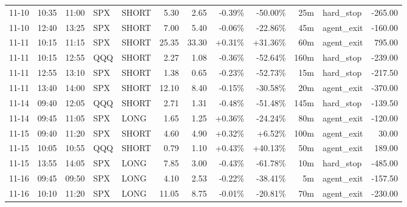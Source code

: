 \documentclass[11pt,a4paper,twoside]{article}
\begin{document}
\begin{center}
\begin{longtable}{>{\color{txtmain}}l l l l l r r r r r >{\color{txtmain}}l r}
11-10 & 10:35 & 11:00 & SPX & SHORT & 5.30 & 2.65 & \textcolor{lossred}{-0.39\%} & \textcolor{lossred}{-50.00\%} & 25m & hard\_stop & \textcolor{lossred}{-265.00} \\
11-10 & 12:40 & 13:25 & SPX & SHORT & 7.00 & 5.40 & \textcolor{lossred}{-0.06\%} & \textcolor{lossred}{-22.86\%} & 45m & agent\_exit & \textcolor{lossred}{-160.00} \\
11-11 & 10:15 & 11:15 & SPX & SHORT & 25.35 & 33.30 & \textcolor{wingreen}{+0.31\%} & \textcolor{wingreen}{+31.36\%} & 60m & agent\_exit & \textcolor{wingreen}{795.00} \\
11-11 & 10:15 & 12:55 & QQQ & SHORT & 2.27 & 1.08 & \textcolor{lossred}{-0.36\%} & \textcolor{lossred}{-52.64\%} & 160m & hard\_stop & \textcolor{lossred}{-239.00} \\
11-11 & 12:55 & 13:10 & SPX & SHORT & 1.38 & 0.65 & \textcolor{lossred}{-0.23\%} & \textcolor{lossred}{-52.73\%} & 15m & hard\_stop & \textcolor{lossred}{-217.50} \\
11-11 & 13:40 & 14:00 & SPX & SHORT & 12.10 & 8.40 & \textcolor{lossred}{-0.15\%} & \textcolor{lossred}{-30.58\%} & 20m & agent\_exit & \textcolor{lossred}{-370.00} \\
11-14 & 09:40 & 12:05 & QQQ & SHORT & 2.71 & 1.31 & \textcolor{lossred}{-0.48\%} & \textcolor{lossred}{-51.48\%} & 145m & hard\_stop & \textcolor{lossred}{-139.50} \\
11-14 & 09:45 & 11:05 & SPX & LONG & 1.65 & 1.25 & \textcolor{wingreen}{+0.36\%} & \textcolor{lossred}{-24.24\%} & 80m & agent\_exit & \textcolor{lossred}{-120.00} \\
11-15 & 09:40 & 11:20 & SPX & SHORT & 4.60 & 4.90 & \textcolor{wingreen}{+0.32\%} & \textcolor{wingreen}{+6.52\%} & 100m & agent\_exit & \textcolor{wingreen}{30.00} \\
11-15 & 10:05 & 10:55 & QQQ & SHORT & 0.79 & 1.10 & \textcolor{wingreen}{+0.43\%} & \textcolor{wingreen}{+40.13\%} & 50m & agent\_exit & \textcolor{wingreen}{189.00} \\
11-15 & 13:55 & 14:05 & SPX & LONG & 7.85 & 3.00 & \textcolor{lossred}{-0.43\%} & \textcolor{lossred}{-61.78\%} & 10m & hard\_stop & \textcolor{lossred}{-485.00} \\
11-16 & 09:45 & 09:50 & SPX & LONG & 4.10 & 2.53 & \textcolor{lossred}{-0.22\%} & \textcolor{lossred}{-38.41\%} & 5m & agent\_exit & \textcolor{lossred}{-157.50} \\
11-16 & 10:10 & 11:20 & SPX & LONG & 11.05 & 8.75 & \textcolor{lossred}{-0.01\%} & \textcolor{lossred}{-20.81\%} & 70m & agent\_exit & \textcolor{lossred}{-230.00} \\

\end{longtable}
\end{center}
\end{document}
